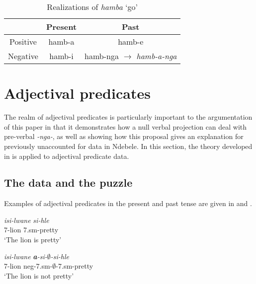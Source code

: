 \documentclass[output=paper]{langsci/langscibook}
\begin{document}
\begin{table}
\caption{Realizations of \textit{hamba} `go'} %
\centering %
\begin{tabular}{|c|c|c|} %
\hline%
 & Present & Past\\ [0.5ex] 
\hline %
Positive & hamb-a  & hamb-e  \\ %
Negative & hamb-i & hamb-nga $\longrightarrow$ \textit{hamb-a-nga}\\[1ex] %
\hline %
\end{tabular} 
\label{tab:hresult} 
\end{table} 





\section{Adjectival predicates}

The realm of adjectival predicates is particularly important to the argumentation of this paper in that it demonstrates how a null verbal projection can deal with pre-verbal \textit{-nga-}, as well as showing how this proposal gives an explanation for previously unaccounted for data in Ndebele. In this section, the theory developed in  is applied to adjectival predicate data.

\subsection{The data and the puzzle}

Examples of adjectival predicates in the present and past tense are given in  and .

\begin{exe}
\ex \begin{xlist}
\ex \gll \textit{isi-lwane} \textit{si-hle}\\
       7-lion 7.{\sc sm}-pretty\\
    \glt `The lion is pretty' 

\ex \gll \textit{isi-lwane} \textit{\textbf{a}-si-$\emptyset$-si-hle}\\
       7-lion {\sc neg}-7.{\sc sm}-$\emptyset$-7.{\sc sm}-pretty\\
    \glt `The lion is not pretty' 
\end{xlist}
\end{exe}
\end{document}
